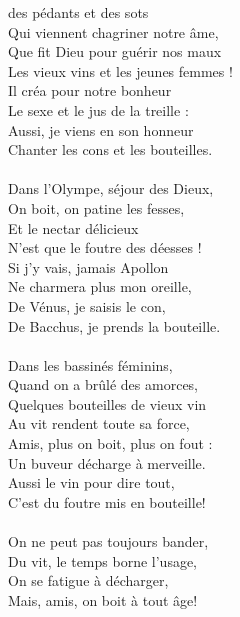 
 des pédants et des sots
\\Qui viennent chagriner notre âme,
\\Que fit Dieu pour guérir nos maux
\\Les vieux vins et les jeunes femmes !
\\Il créa pour notre bonheur
\\Le sexe et le jus de la treille :
\\Aussi, je viens en son honneur
\\Chanter les cons et les bouteilles. \bissimple
\\\\Dans l'Olympe, séjour des Dieux,
\\On boit, on patine les fesses,
\\Et le nectar délicieux
\\N'est que le foutre des déesses !
\\Si j'y vais, jamais Apollon
\\Ne charmera plus mon oreille,
\\De Vénus, je saisis le con,
\\De Bacchus, je prends la bouteille. \bissimple
\\\\Dans les bassinés féminins,
\\Quand on a brûlé des amorces,
\\Quelques bouteilles de vieux vin
\\Au vit rendent toute sa force,
\\Amis, plus on boit, plus on fout :
\\Un buveur décharge à merveille.
\\Aussi le vin pour dire tout,
\\C'est du foutre mis en bouteille! \bissimple
\\\\On ne peut pas toujours bander,
\\Du vit, le temps borne l'usage,
\\On se fatigue à décharger,
\\Mais, amis, on boit à tout âge!
